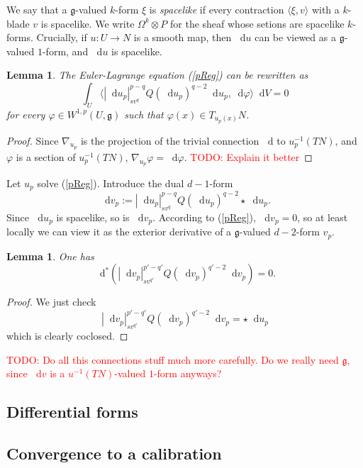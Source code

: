 \documentclass[reqno,11pt]{amsart}
\newcommand*\dif{\mathop{}\!\mathrm{d}}
\newcommand{\frkg}{\mathfrak g}
\newcommand{\dfn}[1]{\emph{#1}\index{#1}}
\newtheorem{lemma}[theorem]{Lemma}
\theoremstyle{definition}
\numberwithin{equation}{section}
\newcommand\todo[1]{\textcolor{red}{TODO: #1}}
\begin{document}
We say that a $\frkg$-valued $k$-form $\xi$ is \dfn{spacelike} if every contraction $\langle \xi, v\rangle$ with a $k$-blade $v$ is spacelike.
We write $\Omega^k \otimes P$ for the sheaf whose setions are spacelike $k$-forms.
Crucially, if $u: U \to N$ is a smooth map, then $\dif u$ can be viewed as a $\frkg$-valued $1$-form, and $\dif u$ is spacelike.

\begin{lemma}
The Euler-Lagrange equation (\ref{pReg}) can be rewritten as 
$$\int_U \langle |\dif u_p|_{sv^q}^{p - q} Q(\dif u_p)^{q - 2} \dif u_p, \dif \varphi\rangle \dif V = 0$$
for every $\varphi \in W^{1, p}(U, \frkg)$ such that $\varphi(x) \in T_{u_p(x)} N$.
\end{lemma}
\begin{proof}
Since $\nabla_{u_p}$ is the projection of the trivial connection $\dif$ to $u_p^{-1}(TN)$, and $\varphi$ is a section of $u_p^{-1}(TN)$, $\nabla_{u_p} \varphi = \dif \varphi$. \todo{Explain it better}
\end{proof}

Let $u_p$ solve (\ref{pReg}).
Introduce the dual $d - 1$-form
$$\dif v_p := |\dif u_p|_{sv^q}^{p - q} Q(\dif u_p)^{q - 2} \star \dif u_p.$$
Since $\dif u_p$ is spacelike, so is $\dif v_p$.
According to (\ref{pReg}), $\dif v_p = 0$, so at least locally we can view it as the exterior derivative of a $\frkg$-valued $d - 2$-form $v_p$.

\begin{lemma}
One has 
$$\dif^*(|\dif v_p|_{sv^{q'}}^{p' - q'} Q(\dif v_p)^{q' - 2} \dif v_p) = 0.$$
\end{lemma}
\begin{proof}
We just check 
$$|\dif v_p|_{sv^{q'}}^{p' - q'} Q(\dif v_p)^{q' - 2} \dif v_p = \star \dif u_p$$
which is clearly coclosed.
\end{proof}

\todo{Do all this connections stuff much more carefully. Do we really need $\frkg$, since $\dif v$ is a $u^{-1}(TN)$-valued $1$-form anyways?}

\subsection{Differential forms}

\subsection{Convergence to a calibration}
\end{document}

